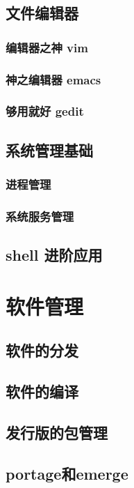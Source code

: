 \documentclass[amstex,twoside]{ctexbook}
\begin{document}
\section{文件编辑器}
\subsection{编辑器之神 vim	}
\subsection{神之编辑器 emacs	}
\subsection{够用就好 gedit	}
\section{系统管理基础}

\subsection{进程管理}
\subsection{系统服务管理}

\section{shell 进阶应用}


\chapter{软件管理}\label{软件管理}



\section{软件的分发}
\section{软件的编译}
\section{发行版的包管理}\label{section:pkgmgr}
\section{portage和emerge}
\end{document}
